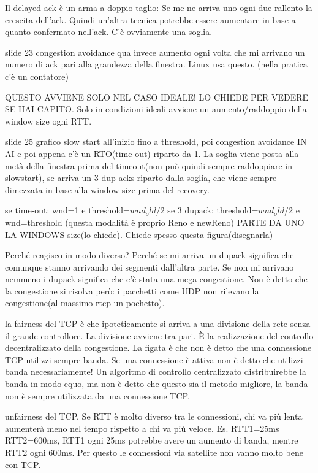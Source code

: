 \documentclass{article}
\begin{document}
Il delayed ack è un arma a doppio taglio: Se me ne arriva uno ogni due rallento la crescita dell'ack. Quindi un'altra tecnica potrebbe 
essere aumentare in base a quanto confermato nell'ack.
C'è ovviamente una soglia.

slide 23
congestion avoidance
qua invece aumento ogni volta che mi arrivano un numero di ack pari alla grandezza della finestra. Linux usa questo. (nella pratica c'è un contatore)

QUESTO AVVIENE SOLO NEL CASO IDEALE! LO CHIEDE PER VEDERE SE HAI CAPITO. Solo in condizioni ideali avviene un aumento/raddoppio della 
window size ogni RTT.

slide 25 grafico 
slow start all'inizio fino a threshold, poi congestion avoidance IN AI e poi appena c'è un RTO(time-out) riparto da 1.
La soglia viene posta alla metà della finestra prima del timeout(non può quindi sempre raddoppiare in slowstart), se arriva 
un 3 dup-acks riparto dalla soglia, che viene sempre dimezzata in base alla window size prima del recovery. 

se time-out: wnd=1 e threshold=$wnd_old$/2
se 3 dupack: threshold=$wnd_old$/2 e wnd=threshold 
(questa modalità è proprio Reno e newReno)
PARTE DA UNO LA WINDOWS size(lo chiede). Chiede spesso questa figura(disegnarla)

Perché reagisco in modo diverso? Perché se mi arriva un dupack significa che comunque stanno arrivando dei segmenti dall'altra parte.
Se non mi arrivano nemmeno i dupack significa che c'è stata una mega congestione.
Non è detto che la congestione si risolva però: i pacchetti come UDP non rilevano la congestione(al massimo rtcp un pochetto).

la fairness del TCP è che ipoteticamente si arriva a una divisione della rete senza il grande controllore. La divisione avviene tra pari. 
È la realizzazione del controllo decentralizzato della congestione. La figata è che non è detto che una connessione TCP utilizzi sempre banda.
Se una connessione è attiva non è detto che utilizzi banda necessariamente! Un algoritmo di controllo centralizzato distribuirebbe la banda in modo equo,
ma non è detto che questo sia il metodo migliore, la banda non è sempre utilizzata da una connessione TCP.

unfairness del TCP. Se RTT è molto diverso tra le connessioni, chi va più lenta aumenterà meno nel tempo rispetto a chi va più veloce. 
Es. RTT1=25ms RTT2=600ms, RTT1 ogni 25ms potrebbe avere un aumento di banda, mentre RTT2 ogni 600ms. Per questo le connessioni via satellite 
non vanno molto bene con TCP. 
\end{document}
